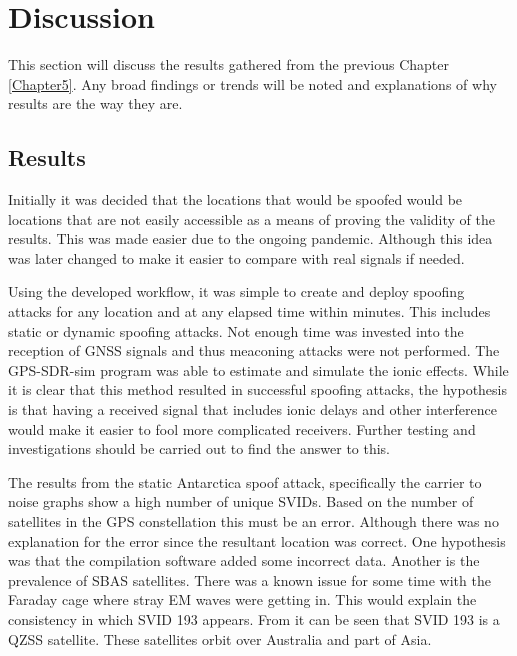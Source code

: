 
\chapter{Discussion} %

\label{Chapter6} %
This section will discuss the results gathered from the previous Chapter \ref{Chapter5}. Any broad findings or trends will be noted and explanations of why results are
the way they are.


\section{Results}
Initially it was decided that the locations that would be spoofed would be locations that are not easily accessible as a means of proving the validity of the results.
This was made easier due to the ongoing pandemic. Although this idea was later changed to make it easier to compare with real signals if needed.

Using the developed workflow, it was simple to create and deploy spoofing attacks for any location and at any elapsed time within minutes. This includes static or dynamic
spoofing attacks. Not enough time was invested into the reception of GNSS signals and thus meaconing attacks were not performed. The GPS-SDR-sim program was able to
estimate and simulate the ionic effects. While it is clear that this method resulted in successful spoofing attacks, the hypothesis is that having a received signal that includes ionic delays
and other interference would make it easier to fool more complicated receivers. Further testing and investigations should be carried out to find the answer to this. 

The results from the static Antarctica spoof attack, specifically the carrier to noise graphs show a high number of unique SVIDs. Based on the number of satellites in the
GPS constellation this must be an error. Although there was no explanation for the error since the resultant location was correct. One hypothesis was that the compilation
software added some incorrect data. Another is the prevalence of SBAS satellites. There was a known issue for some time with the Faraday cage where stray EM waves were
getting in. This would explain the consistency in which SVID 193 appears. From \cite{RN67} it can be seen that SVID 193 is a QZSS satellite. These satellites orbit over
Australia and part of Asia.

